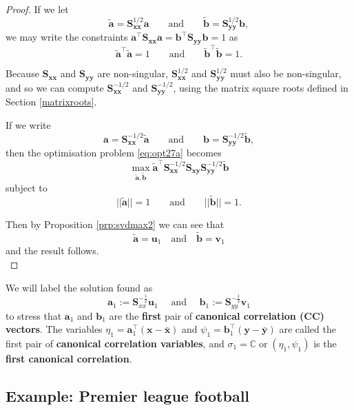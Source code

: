 \documentclass[]{book}
\theoremstyle{definition}
\theoremstyle{definition}
\theoremstyle{definition}
\theoremstyle{remark}
\begin{document}
\begin{proof}
{}If we let
\[
\tilde{\mathbf a}=\mathbf S_{\mathbf x\mathbf x}^{1/2} \mathbf a\qquad \text{and} \qquad \tilde{\mathbf b}=\mathbf S_{\mathbf y\mathbf y}^{1/2}\mathbf b,
\]
we may write the constraints \(\mathbf a^\top \mathbf S_{\mathbf x\mathbf x}\mathbf a=\mathbf b^\top \mathbf S_{\mathbf y\mathbf y}\mathbf b=1\) as
\[
\tilde{\mathbf a}^\top \tilde{\mathbf a}=1 \qquad \text{and} \qquad \tilde{\mathbf b}^\top \tilde{\mathbf b}=1.
\]

Because \(\mathbf S_{\mathbf x\mathbf x}\) and \(\mathbf S_{\mathbf y\mathbf y}\) are non-singular, \(\mathbf S_{\mathbf x\mathbf x}^{1/2}\) and \(\mathbf S_{\mathbf y\mathbf y}^{1/2}\) must also be non-singular, and so we can compute
\(\mathbf S_{\mathbf x\mathbf x}^{-1/2}\) and \(\mathbf S_{\mathbf y\mathbf y}^{-1/2}\), using the matrix square roots defined in Section \ref{matrixroots}.

If we write
\[
\mathbf a=\mathbf S_{\mathbf x\mathbf x}^{-1/2}\tilde{\mathbf a} \qquad \text{and} \qquad \mathbf b=\mathbf S_{\mathbf y\mathbf y}^{-1/2} \tilde{\mathbf b},
\]
then the optimisation problem \eqref{eq:opt27a} becomes
\[
\max_{\tilde{\mathbf a}, \tilde{\mathbf b}}
\tilde{\mathbf a}^\top \mathbf S_{\mathbf x\mathbf x}^{-1/2}\mathbf S_{\mathbf x\mathbf y}\mathbf S_{\mathbf y\mathbf y}^{-1/2} \tilde{\mathbf b}
\]
subject to
\[
\vert \vert \tilde{\mathbf a} \vert \vert =1 \qquad \text{and} \qquad \vert \vert \tilde{\mathbf b}\vert \vert=1.
\]

Then by Proposition \ref{prp:svdmax2} we can see that
\[\tilde{\mathbf a} = \mathbf u_1 \quad \mbox{and}\quad\tilde{\mathbf b} = \mathbf v_1\]
and the result follows.\\
\end{proof}

We will label the solution found as
\[\mathbf a_1 := \mathbf S_{xx}^{-\frac{1}{2}}\mathbf u_1\quad \mbox{ and }\quad\mathbf b_1 := \mathbf S_{yy}^{-\frac{1}{2}}\mathbf v_1\]
to stress that \(\mathbf a_1\) and \(\mathbf b_1\) are the \textbf{first} pair of \textbf{canonical correlation (CC) vectors}. The variables \(\eta_1=\mathbf a_1^\top (\mathbf x-\bar{\mathbf x})\) and \(\psi_1=\mathbf b_1^\top (\mathbf y-\bar{\mathbf y})\) are called the first pair of \textbf{canonical correlation variables}, and \(\sigma_1={\mathbb{C}\operatorname{or}}(\eta_1, \psi_1)\) is the \textbf{first canonical correlation}.

\hypertarget{premcca}{%
\subsection{Example: Premier league football}\label{premcca}}
\end{document}
